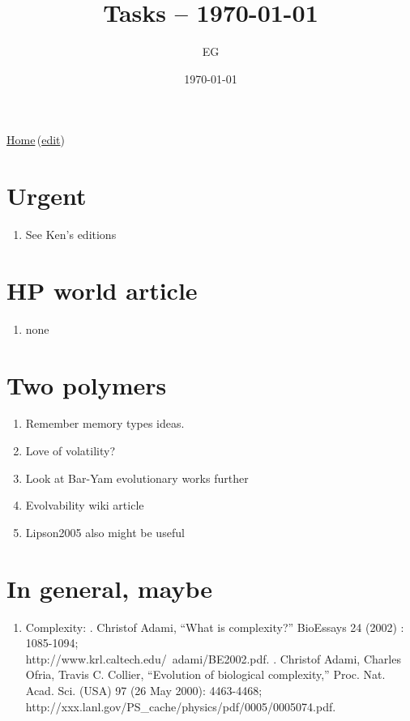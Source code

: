 \documentclass[12pt]{paper}
\title{Tasks  -- \today}
\author{EG}
\date{\today}
\newcommand{\wikilink}[2] { \href{#1.pdf}{#2}\,(\href{#1.tex}{edit})}
\begin{document}
 \maketitle
\wikilink{home}{Home}

\section{Urgent}
\begin{enumerate}
\item See Ken's editions
\end{enumerate}



\section{HP world article}
\begin{enumerate}
 \item none
\end{enumerate}

\section{Two polymers}
\begin{enumerate}
\item Remember memory types ideas.
\item Love of volatility?
 \item Look at Bar-Yam evolutionary works further
 \item Evolvability wiki article
 \item Lipson2005 also might be useful
\end{enumerate}

\section{In general, maybe}
\begin{enumerate}
\item Complexity:
. Christof Adami, ``What is complexity?''
BioEssays 24 (2002) : 1085-1094; \\
http://www.krl.caltech.edu/~adami/BE2002.pdf.
. Christof Adami, Charles Ofria, Travis C. Collier, “Evolution of biological
complexity,” Proc. Nat. Acad. Sci. (USA) 97 (26 May 2000): 4463-4468; \\
http://xxx.lanl.gov/PS\_cache/physics/pdf/0005/0005074.pdf.
\end{enumerate}
\end{document}
